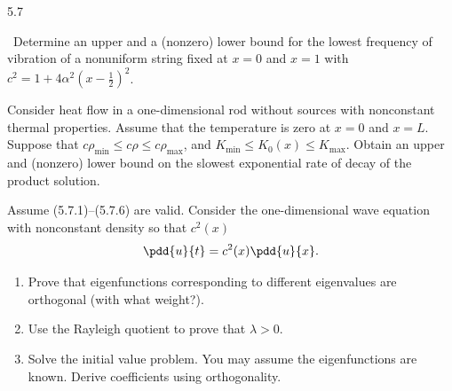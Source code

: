 \begin{exercises}{5.7}

\item\starred\ Determine an upper and a (nonzero) lower bound for the lowest frequency of vibration of a nonuniform string fixed at $x = 0$ and $x = 1$ with $c^2 = 1 + 4\alpha^2\left(x - \frac{1}{2}\right)^2$.

\item Consider heat flow in a one-dimensional rod without sources with nonconstant thermal properties.  Assume that the temperature is zero at $x = 0$ and $x = L$.  Suppose that $c\rho_{\min} \le c\rho \le c\rho_{\max}$, and $K_{\min} \le K_0(x) \le K_{\max}$.  Obtain an upper and (nonzero) lower bound on the slowest exponential rate of decay of the product solution.

\item Assume (5.7.1)--(5.7.6) are valid.  Consider the one-dimensional wave equation with nonconstant density so that $c^2(x)$
\[
\pdd{u}{t} = c^2(x)\pdd{u}{x}.
\]
\begin{enumerate}
\item Prove that eigenfunctions corresponding to different eigenvalues are orthogonal (with what weight?).
\item Use the Rayleigh quotient to prove that $\lambda > 0$.
\item Solve the initial value problem.  You may assume the eigenfunctions are known.  Derive coefficients using orthogonality.
\end{enumerate}

\end{exercises}
